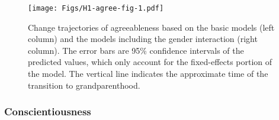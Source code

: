 \documentclass[
  english,
  man,floatsintext]{apa7}
\begin{document}
\begin{figure}
\centering
\texttt{[image: Figs/H1-agree-fig-1.pdf]}
\caption{\label{fig:H1-agree-fig}Change trajectories of agreeableness based on the basic models (left column) and the models including the gender interaction (right column). The error bars are 95\% confidence intervals of the predicted values, which only account for the fixed-effects portion of the model. The vertical line indicates the approximate time of the transition to grandparenthood.}
\end{figure}

\hypertarget{conscientiousness}{%
\subsubsection{Conscientiousness}\label{conscientiousness}}
\end{document}
